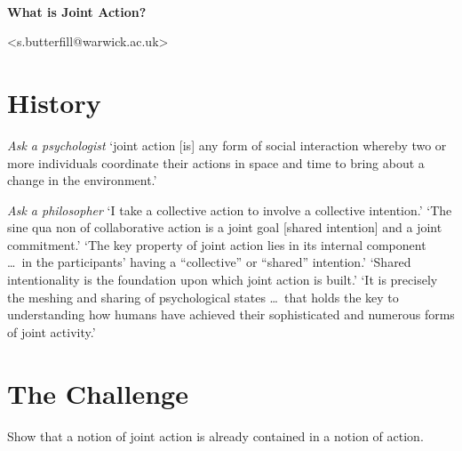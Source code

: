 \documentclass[11pt]{extarticle}
\date{}
\begin{document}
\begin{multicols}{3}

\setlength\footnotesep{1em}






\

\begin{center}
{\Large
\textbf{What is Joint Action?}
}

<s.butterfill@warwick.ac.uk>

\end{center}




\section{History}

\emph{Ask a psychologist}
`joint action [is] any form of social interaction whereby two or more individuals coordinate their actions in space and time to bring about a change in the environment.'%
\citep{Sebanz:2006yq}

\emph{Ask a philosopher} 
`I take a collective action to involve a collective intention.'  \citep%
{Gilbert:2006wr}
%
`The sine qua non of collaborative action is a joint goal [shared intention] and a joint commitment.' 
\citep%
{tomasello:2008origins}
%
`The key property of joint action lies in its internal component \ldots \ in the participants’ having a ``collective'' or ``shared'' intention.' \citep%
{alonso_shared_2009}
%
`Shared intentionality is the foundation upon which joint action is built.' \citep%
{Carpenter:2009wq}
%
`It is precisely the meshing and sharing of psychological states \ldots \ that holds the key to understanding how humans have achieved their sophisticated and numerous forms of joint activity.'
\citep%
{Call:2009fk}


\section{The Challenge}

Show that a notion of joint action is already contained in a notion of action.


\end{multicols}
\end{document}
